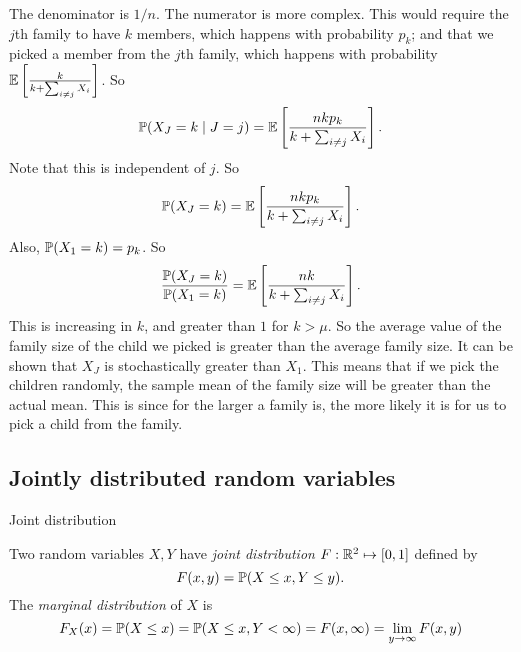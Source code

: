 \begin{note}
\begin{field}
\begin{eg}
\[      \]
      The denominator is $1/n$. The numerator is more complex. This would require the $j$th family to have $k$ members, which happens with probability $p_k$; and that we picked a member from the $j$th family, which happens with probability $\E\left[\frac{k}{k + \sum_{i \not=j} X_i}\right]$. So
      \[
        \P(X_J = k \mid J = j) = \E\left[\frac{nkp_k}{k + \sum_{i \not=j} X_i}\right].
      \]
      Note that this is independent of $j$. So
      \[
        \P(X_J = k) = \E\left[\frac{nkp_k}{k + \sum_{i \not=j} X_i}\right].
      \]
      Also, $\P(X_1 = k) = p_k$. So
      \[
        \frac{\P(X_J = k)}{\P(X_1 = k)} = \E\left[\frac{nk}{k + \sum_{i \not= j}X_i}\right].
      \]
      This is increasing in $k$, and greater than $1$ for $k > \mu$. So the average value of the family size of the child we picked is greater than the average family size. It can be shown that $X_J$ is stochastically greater than $X_1$.
      This means that if we pick the children randomly, the sample mean of the family size will be greater than the actual mean. This is since for the larger a family is, the more likely it is for us to pick a child from the family.
    \end{eg}
  \end{field}
  \xplain{}%
\end{note}

\subsection{Jointly distributed random variables}

%
\begin{note}
  \begin{field}
    Joint distribution
  \end{field}
  \begin{field}
    \begin{defi}
      Two random variables $X, Y$ have \emph{joint distribution} $F: \R^2 \mapsto [0, 1]$ defined by
      \[
        F(x, y) = \P(X \leq x, Y \leq y).
      \]
      The \emph{marginal distribution} of $X$ is
      \[
        F_X(x) = \P(X \leq x) = \P(X \leq x, Y < \infty) = F(x, \infty) = \lim_{y \to \infty}F(x, y)
      \]
    \end{defi}
  \end{field}
  \xplain{}%
\end{note}

